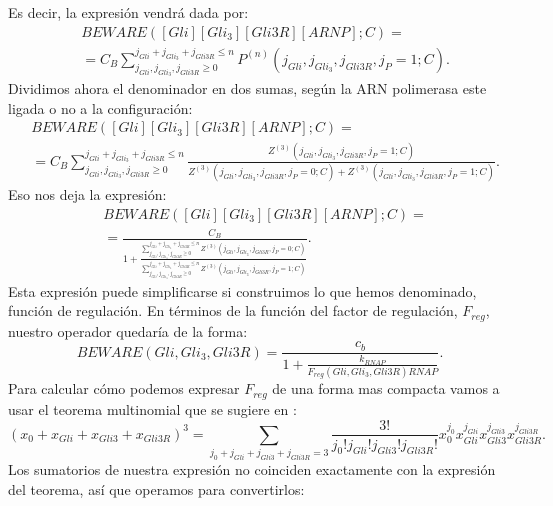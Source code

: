 Es decir, la expresión vendrá dada por: 
\begin{equation}
\begin{split}
&BEWARE([Gli][Gli_3][Gli3R][ARNP];C)=\\&=C_B\sum_{j_{Gli}, j_{Gli_3}, j_{Gli3R}\geq0}^{j_{Gli}+ j_{Gli_3}+ j_{Gli3R}\leq n}P^{(n)}(j_{Gli}, j_{Gli_3}, j_{Gli3R},j_P=1;C).
\end{split}
\end{equation}
Dividimos ahora el denominador en dos sumas, según la ARN polimerasa este ligada o no a la configuración:
\begin{equation}
\begin{split}
&BEWARE([Gli][Gli_3][Gli3R][ARNP];C)=\\&=C_B\sum_{j_{Gli}, j_{Gli_3}, j_{Gli3R}\geq0}^{j_{Gli}+ j_{Gli_3}+ j_{Gli3R}\leq n}\frac{Z^{(3)}(j_{Gli}, j_{Gli_3}, j_{Gli3R},j_P=1;C)}{Z^{(3)}(j_{Gli}, j_{Gli_3}, j_{Gli3R},j_P=0;C)+Z^{(3)}(j_{Gli}, j_{Gli_3}, j_{Gli3R},j_P=1;C)}.
\end{split}
\end{equation}
Eso nos deja la expresión:
\begin{equation}
\begin{split}
&BEWARE([Gli][Gli_3][Gli3R][ARNP];C)=\\&=\frac{C_B}{1+\frac{\sum_{j_{Gli}, j_{Gli_3}, j_{Gli3R}\geq0}^{j_{Gli}+ j_{Gli_3}+ j_{Gli3R}\leq n}Z^{(3)}(j_{Gli}, j_{Gli_3}, j_{Gli3R},j_P=0;C)}{\sum_{j_{Gli}, j_{Gli_3}, j_{Gli3R}\geq0}^{j_{Gli}+ j_{Gli_3}+ j_{Gli3R}\leq n}Z^{(3)}(j_{Gli}, j_{Gli_3}, j_{Gli3R},j_P=1;C)}}.
\end{split}
\end{equation}
Esta expresión puede simplificarse si construimos lo que hemos denominado, función de regulación. En términos de la función del factor de regulación, $F_{reg}$, nuestro operador quedaría de la forma:
\begin{equation}
BEWARE(Gli, Gli_3, Gli3R)=\frac{c_{b}}{1 + \frac{k_{RNAP}}{F_{reg}(Gli, Gli_3, Gli3R) RNAP}}.
\end{equation}
Para calcular cómo podemos expresar $F_{reg}$ de una forma mas compacta vamos a usar el teorema multinomial que se sugiere en \cite{cambon1}:
\begin{equation}
(x_0+x_{Gli}+x_{Gli3}+x_{Gli3R})^3=\sum_{j_0+j_{Gli}+j_{Gli3}+j_{Gli3R}=3}\frac{3!}{j_0!j_{Gli}!j_{Gli3}!j_{Gli3R}!}x_0^{j_0}x_{Gli}^{j_{Gli}}x_{Gli3}^{j_{Gli3}}x_{Gli3R}^{j_{Gli3R}}.\label{S:21}
\end{equation}
Los sumatorios de nuestra expresión no coinciden exactamente con la expresión del teorema, así que operamos para convertirlos: 
